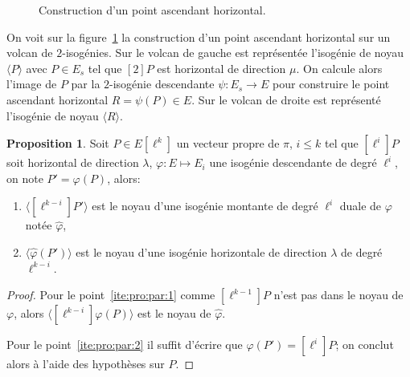 \documentclass[10pt,a4paper]{book}
\theoremstyle{plain}
\theoremstyle{definition}
\theoremstyle{definition}
\theoremstyle{definition}
\theoremstyle{definition}
\newtheorem{prop}[thm]{Proposition}
\theoremstyle{definition}
\theoremstyle{remark}
\theoremstyle{remark}
\theoremstyle{definition}
\begin{document}
\begin{figure}
\begin{center}
\begin{tikzpicture}[scale=0.50]
\end{tikzpicture}
\end{center}
\caption{ \label{fig:par:hor:con} Construction d'un point ascendant 
horizontal.} %
\end{figure}

On voit sur la figure~\ref{fig:par:hor:con} la construction d'un point 
ascendant horizontal sur un volcan de $2$-isogénies. Sur le volcan de 
gauche est représentée l'isogénie de noyau $\langle P \rangle$ avec $P \in E_s$
tel que $[2]P$ est horizontal de direction  $\mu$. On calcule 
alors l'image de $P$ par la $2$-isogénie descendante $\psi:E_s \rightarrow E$
pour construire le point ascendant horizontal $R=\psi(P) \in E$. Sur le 
volcan de droite est représenté l'isogénie de noyau $\langle R \rangle$.

\begin{prop}
\label{pro:elk:par:hor}
Soit $P \in E[\ell^k]$ un vecteur propre de $\pi$, $i\leqslant k$ tel que 
$[\ell^i]P$ soit horizontal de direction $\lambda$, $\varphi:E \mapsto E_i$ une
isogénie descendante de degré $\ell^i$, on note $P'=\varphi(P)$, alors:
\begin{enumerate}
\item \label{ite:pro:par:1} $\langle [\ell^{k-i}]P' \rangle$ est le noyau d'une isogénie montante de
degré $\ell^{i}$ duale de $\varphi$ notée $\widehat{\varphi}$, 
\item \label{ite:pro:par:2} $\langle \widehat{\varphi}(P') \rangle$ est le noyau d'une isogénie 
horizontale de direction $\lambda$ de degré $\ell^{k-i}$.  
\end{enumerate}
\end{prop}

\begin{proof}
Pour le point~\eqref{ite:pro:par:1} comme $[\ell^{k-1}]P$ n'est pas dans le 
noyau de $\varphi$, alors $\langle [\ell^{k-i}]\varphi(P) \rangle $ est le 
noyau de $\widehat{\varphi}$. 

 

Pour le point~\eqref{ite:pro:par:2} il suffit d'écrire que $\widehat{\varphi}
(P')= [\ell^i] P$; on conclut alors à l'aide
des hypothèses sur $P$.
\end{proof}
\end{document}
